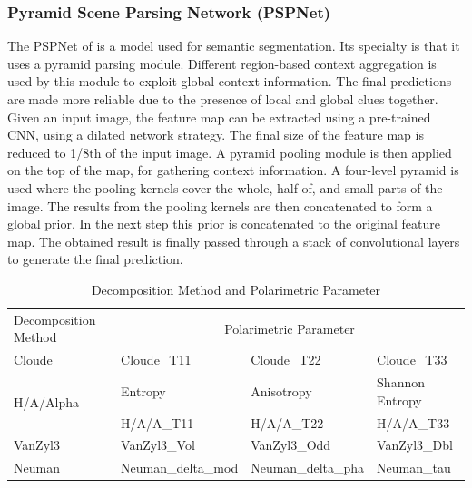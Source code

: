 \documentclass[a4paper,12pt]{spieman}  %
\begin{document}
\begin{spacing}{1}
\subsubsection{Pyramid Scene Parsing Network (PSPNet)}
The PSPNet of \citep{zhao2017pyramid} is a model used for semantic segmentation. Its specialty is that it uses a pyramid parsing module. Different region-based context aggregation is used by this module to exploit global context information. The final predictions are made more reliable due to the presence of local and global clues together. Given an input image, the feature map can be extracted using a pre-trained CNN, using a dilated network strategy. The final size of the feature map is reduced to 1/8th of the input image. A pyramid pooling module is then applied on the top of the map, for gathering context information. A four-level pyramid is used where the pooling kernels cover the whole, half of, and small parts of the image. The results from the pooling kernels are then concatenated to form a global prior. In the next step this prior is concatenated to the original feature map. The obtained result is finally passed through a stack of convolutional layers to generate the final prediction.
\bgroup
\def\arraystretch{1.5}%
\begin{table}[h!]
\captionsetup{justification=centering,margin=2cm}
\caption{Decomposition Method and Polarimetric Parameter}
\begin{tabular}{|l|lll|}
\hline
\multirow{2}{*}{Decomposition Method} & \multicolumn{3}{c|}{\multirow{2}{*}{Polarimetric Parameter}} \\
                                      & \multicolumn{3}{l|}{}                                         \\ \hline
Cloude\citep{485127} & Cloude\_T11         & Cloude\_T22         & Cloude\_T33       \\ \hline
\multirow{2}{*}{H/A/Alpha\citep{pottier2000application}}            & Entropy             & Anisotropy          & Shannon Entropy   \\
                                      & H/A/A\_T11          & H/A/A\_T22          & H/A/A\_T33        \\ \hline
VanZyl3\citep{pottier2000application}                               & VanZyl3\_Vol        & VanZyl3\_Odd        & VanZyl3\_Dbl      \\ \hline
Neuman\citep{neumann2009general}                                & Neuman\_delta\_mod  & Neuman\_delta\_pha  & Neuman\_tau       \\ \hline


\end{tabular}
\end{table}
\end{spacing}
\end{document}
